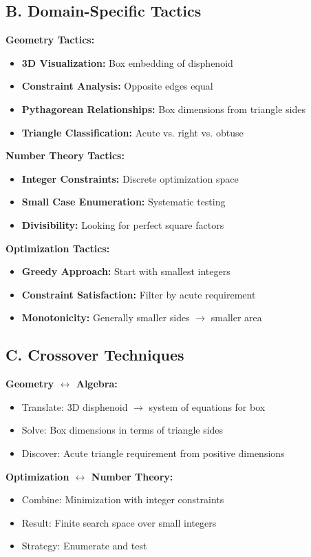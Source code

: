 \documentclass[12pt]{article}
\begin{document}
\begin{tacticalbox}
\subsection*{B. Domain-Specific Tactics}

\textbf{Geometry Tactics:}
\begin{itemize}
    \item \textbf{3D Visualization:} Box embedding of disphenoid
    \item \textbf{Constraint Analysis:} Opposite edges equal
    \item \textbf{Pythagorean Relationships:} Box dimensions from triangle sides
    \item \textbf{Triangle Classification:} Acute vs. right vs. obtuse
\end{itemize}

\textbf{Number Theory Tactics:}
\begin{itemize}
    \item \textbf{Integer Constraints:} Discrete optimization space
    \item \textbf{Small Case Enumeration:} Systematic testing
    \item \textbf{Divisibility:} Looking for perfect square factors
\end{itemize}

\textbf{Optimization Tactics:}
\begin{itemize}
    \item \textbf{Greedy Approach:} Start with smallest integers
    \item \textbf{Constraint Satisfaction:} Filter by acute requirement
    \item \textbf{Monotonicity:} Generally smaller sides $\to$ smaller area
\end{itemize}

\subsection*{C. Crossover Techniques}

\textbf{Geometry $\leftrightarrow$ Algebra:}
\begin{itemize}
    \item Translate: 3D disphenoid $\to$ system of equations for box
    \item Solve: Box dimensions in terms of triangle sides
    \item Discover: Acute triangle requirement from positive dimensions
\end{itemize}

\textbf{Optimization $\leftrightarrow$ Number Theory:}
\begin{itemize}
    \item Combine: Minimization with integer constraints
    \item Result: Finite search space over small integers
    \item Strategy: Enumerate and test
\end{itemize}

\end{tacticalbox}
\end{document}
